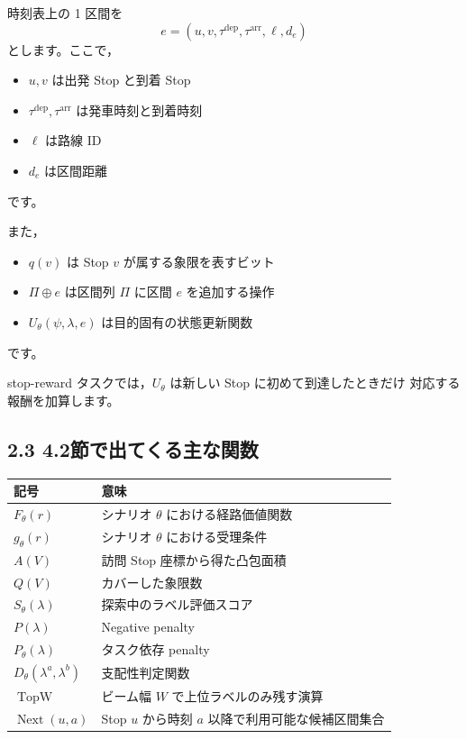 \documentclass[a4paper,11pt]{article}
\begin{document}
時刻表上の 1 区間を
\[
e=(u,v,\tau^{\mathrm{dep}},\tau^{\mathrm{arr}},\ell,d_e)
\]
とします。ここで，
\begin{itemize}
    \item $u, v$ は出発 Stop と到着 Stop
    \item $\tau^{\mathrm{dep}}, \tau^{\mathrm{arr}}$ は発車時刻と到着時刻
    \item $\ell$ は路線 ID
    \item $d_e$ は区間距離
\end{itemize}
です。

また，
\begin{itemize}
    \item $q(v)$ は Stop $v$ が属する象限を表すビット
    \item $\Pi \oplus e$ は区間列 $\Pi$ に区間 $e$ を追加する操作
    \item $U_{\theta}(\psi,\lambda,e)$ は目的固有の状態更新関数
\end{itemize}
です。

stop-reward タスクでは，$U_{\theta}$ は新しい Stop に初めて到達したときだけ
対応する報酬を加算します。

\subsection*{2.3 4.2節で出てくる主な関数}

\begin{tabularx}{\linewidth}{L{3.0cm}X}
\toprule
記号 & 意味 \\
\midrule
$F_{\theta}(r)$ & シナリオ $\theta$ における経路価値関数 \\
$g_{\theta}(r)$ & シナリオ $\theta$ における受理条件 \\
$A(V)$ & 訪問 Stop 座標から得た凸包面積 \\
$Q(V)$ & カバーした象限数 \\
$S_{\theta}(\lambda)$ & 探索中のラベル評価スコア \\
$P(\lambda)$ & Negative penalty \\
$P_{\theta}(\lambda)$ & タスク依存 penalty \\
$D_{\theta}(\lambda^a,\lambda^b)$ & 支配性判定関数 \\
$\operatorname{TopW}$ & ビーム幅 $W$ で上位ラベルのみ残す演算 \\
$\operatorname{Next}(u,a)$ & Stop $u$ から時刻 $a$ 以降で利用可能な候補区間集合 \\
\bottomrule
\end{tabularx}
\end{document}
